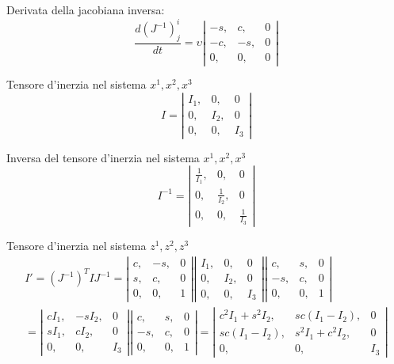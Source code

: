\documentclass[a4paper,11pt]{article}
\begin{document}
Derivata della jacobiana inversa:
\[
	\frac{d (J^{-1})^i_j}{dt} = \upsilon
	\left|
\begin{array}{lll}
	-s, & c, & 0
\\
	-c, &-s, & 0
\\
	0, & 0, & 0
\end{array}
	\right|
\]

Tensore d'inerzia nel sistema $ x^1, x^2, x^3 $ 
\begin{equation}
	I =
\left|
\begin{array}{lll}
	I_1,	&	0,	&	0
	\\
	0,	&	I_2,	&	0
	\\
	0,	&	0,	&	I_3
\end{array}
\right|
\end{equation}

Inversa del tensore d'inerzia nel sistema $ x^1, x^2, x^3 $ 
\begin{equation}
	I^{-1} =
\left|
\begin{array}{lll}
	\frac{1}{I_1},	&	0,			&	0
	\\
	0,			&	\frac{1}{I_2},	&	0
	\\
	0,			&	0,			&	\frac{1}{I_3}	
\end{array}
\right|
\end{equation}


Tensore d'inerzia nel sistema $ z^1, z^2, z^3 $ 
\begin{eqnarray*}
	I' = (J^{-1})^T I J^{-1} =
\left|
\begin{array}{lll}
	c,	&	-s,	&	0
	\\
	s,	&	c,	&	0
	\\
	0,	&	0,	&	1
\end{array}
\right|
\left|
\begin{array}{lll}
	I_1,	&	0,	&	0
	\\
	0,	&	I_2,	&	0
	\\
	0,	&	0,	&	I_3
\end{array}
\right|
\left|
\begin{array}{lll}
	c,	&	s,	&	0
	\\
	-s,	&	c,	&	0
	\\
	0,	&	0,	&	1
\end{array}
\right|
\\
=\left|
\begin{array}{lll}
	c I_1,	&	-s I_2,	&	0
	\\
	s I_1,	&	c I_2,	&	0
	\\
	0,		&	0,		&	I_3
\end{array}
\right|
\left|
\begin{array}{lll}
	c,	&	s,	&	0
	\\
	-s,	&	c,	&	0
	\\
	0,	&	0,	&	1
\end{array}
\right|
=\left|
\begin{array}{lll}
	c^2 I_1 + s^2 I_2,	&	s c (I_1 - I_2),		&	0
	\\
	s c (I_1 - I_2),		&	s^2 I_1 + c^2 I_2,	&	0
	\\
	0,				&	0,				&	I_3
\end{array}
\right|
\end{eqnarray*}
\end{document}
